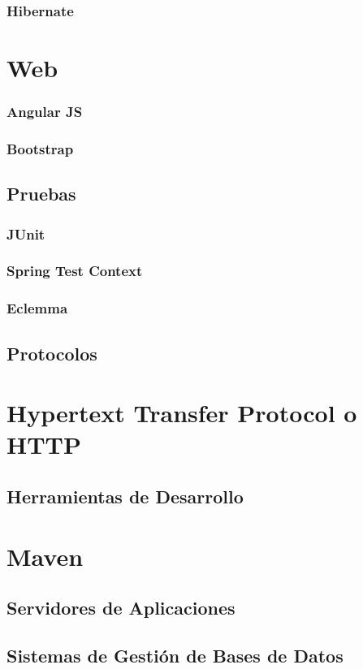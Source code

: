 \documentclass[12pt, a4paper, twoside]{book}
\begin{document}
	\subsubsection{Hibernate}	
	\section{Web}
	\subsubsection{Angular JS}
	\subsubsection{Bootstrap}     
	\subsection{Pruebas}
	\subsubsection{JUnit}
	\subsubsection{Spring Test Context}
	\subsubsection{Eclemma}	
	\subsection{Protocolos}
	\section{Hypertext Transfer Protocol o HTTP}
	\subsection{Herramientas de Desarrollo}
	\section{Maven}
	\subsection{Servidores de Aplicaciones}
	\subsection{Sistemas de Gestión de Bases de Datos}
\end{document}
